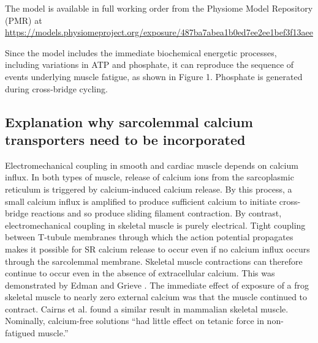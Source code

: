 \documentclass[fleqn,10pt]{physiome}
\begin{document}
The model is available in full working order from the Physiome Model Repository (PMR) at \url{https://models.physiomeproject.org/exposure/487ba7abea1b0ed7ee2ee1bef3f13aee}

Since the model includes the immediate biochemical energetic processes, including variations in ATP and phosphate, it can reproduce the sequence of events underlying muscle fatigue, as shown in Figure 1. Phosphate is generated during cross-bridge cycling.

\subsection{Explanation why sarcolemmal calcium transporters need to be incorporated}

Electromechanical coupling in smooth and cardiac muscle depends on calcium influx. In both types of muscle, release of calcium ions from the sarcoplasmic reticulum is triggered by calcium-induced calcium release. By this process, a small calcium influx is amplified to produce sufficient calcium to initiate cross-bridge reactions and so produce sliding filament contraction. By contrast, electromechanical coupling in skeletal muscle is purely electrical. Tight coupling between T-tubule membranes through which the action potential propagates makes it possible for SR calcium release to occur even if no calcium influx occurs through the sarcolemmal membrane. Skeletal muscle contractions can therefore continue to occur even in the absence of extracellular calcium. This was demonstrated by Edman and Grieve \citep{edman1964role}. The immediate effect of exposure of a frog skeletal muscle to nearly zero external calcium was that the muscle continued to contract. Cairns et al. \citep{cairns1998role} found a similar result in mammalian skeletal muscle. Nominally, calcium-free solutions “had little effect on tetanic force in non-fatigued muscle.”
\end{document}
